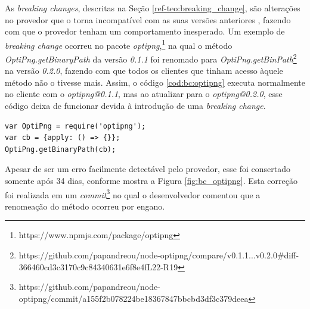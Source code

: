 As \textit{breaking changes}, descritas na Seção \ref{ref-teo:breaking_change}, são alterações no provedor que o torna incompatível com as suas versões anteriores \cite{intro:break_change}, fazendo com que o provedor tenham um comportamento inesperado. Um exemplo de \textit{breaking change} ocorreu no pacote \textit{optipng},\footnote{https://www.npmjs.com/package/optipng} na qual o método \textit{OptiPng.getBinaryPath} da versão \textit{0.1.1} foi renomado para \textit{OptiPng.getBinPath}\footnote{https://github.com/papandreou/node-optipng/compare/v0.1.1...v0.2.0\#diff-366460cd3c3170c9c84340631e6f8e4fL22-R19} na versão \textit{0.2.0}, fazendo com que todos os clientes que tinham acesso àquele método não o tivesse mais. Assim, o código \ref{cod:bc:optipng} executa normalmente no cliente com o \textit{optipng@0.1.1}, mas ao atualizar para o \textit{optipng@0.2.0}, esse código deixa de funcionar devida à introdução de uma \textit{breaking change}.

\begin{lstlisting}[style=Javascript, label=cod:bc:optipng, caption={Código que sofre \textit{breaking change} do pacote \textit{optipng}}]
var OptiPng = require('optipng');
var cb = {apply: () => {}};
OptiPng.getBinaryPath(cb);
\end{lstlisting}

Apesar de ser um erro facilmente detectável pelo provedor, esse foi consertado somente após 34 dias, conforme mostra a Figura \ref{fig:bc_optipng}. Esta correção foi realizada em um \textit{commit}\footnote{https://github.com/papandreou/node-optipng/commit/a155f2b078224be18367847bbcbd3df3c379deea} no qual o desenvolvedor comentou que a renomeação do método ocorreu por engano.

